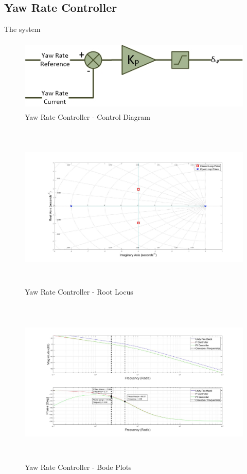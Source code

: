 		\subsection{Yaw Rate Controller}	
		The system 
		
		\begin{figure}[H]
			\centering
			\includegraphics[height = 3.5cm]{../References/Diagrams/YawRateController.jpg}
			\caption{Yaw Rate Controller -  Control Diagram}
			\label{IM_YawRateController}
		\end{figure}
		
		\begin{figure}[H]
			\centering
			\includegraphics[height = 8cm]{../Design/Matlab/Controllers/yaw_rate_root.jpg}
			\caption{Yaw Rate Controller -  Root Locus}
			\label{IM_YawRateControlRoot}
		\end{figure}
		
		\begin{figure}[H]
			\centering
			\includegraphics[height = 8cm]{../Design/Matlab/Controllers/yaw_rate_bode.jpg}
			\caption{Yaw Rate Controller -  Bode Plots}
			\label{IM_YawRateControlBode}
		\end{figure}
		
